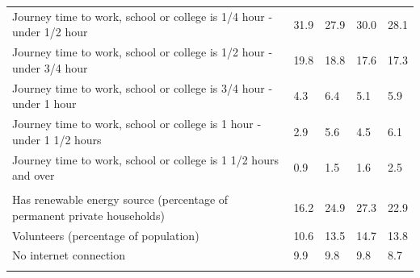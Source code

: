 \documentclass{article}
\begin{document}
\begin{table}[h]
\begin{tabular}{KTTTT}
Journey time to work, school or college is 1/4 hour - under 1/2 hour & 31.9& 27.9& 30.0& 28.1\\
Journey time to work, school or college is 1/2 hour - under 3/4 hour & 19.8& 18.8& 17.6& 17.3\\
Journey time to work, school or college is 3/4 hour - under 1 hour & 4.3& 6.4& 5.1& 5.9\\
Journey time to work, school or college is 1 hour - under 1 1/2 hours & 2.9& 5.6& 4.5& 6.1\\
Journey time to work, school or college is 1 1/2 hours and over & 0.9& 1.5& 1.6& 2.5\\
\hline
    \\ 
    \hline
Has renewable energy source (percentage of permanent private households) & 16.2& 24.9& 27.3& 22.9\\
    \hline
Volunteers (percentage of population) & 10.6& 13.5& 14.7& 13.8\\
    \hline
No internet connection& 9.9& 9.8& 9.8& 8.7\\
\hline
\end{tabular}
\end{table}
\end{document}
